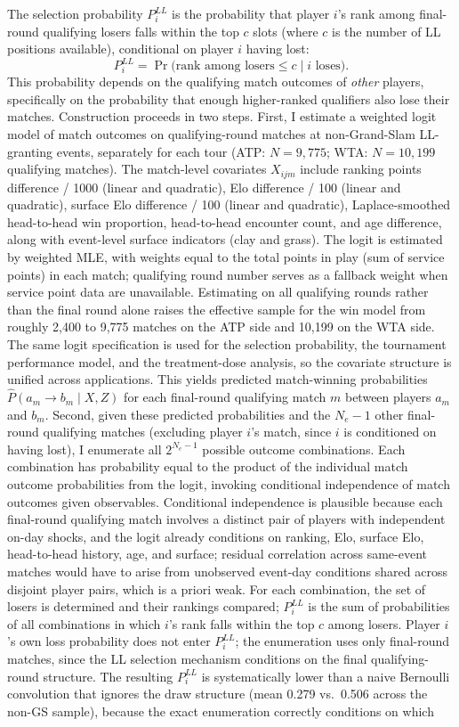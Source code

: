The selection probability $P_i^{LL}$ is the probability that player $i$'s rank among final-round qualifying losers falls within the top $c$ slots (where $c$ is the number of LL positions available), conditional on player $i$ having lost:
\[
P_i^{LL} = \Pr\bigl(\text{rank among losers} \leq c \mid i \text{ loses}\bigr).
\]
This probability depends on the qualifying match outcomes of \textit{other} players, specifically on the probability that enough higher-ranked qualifiers also lose their matches. Construction proceeds in two steps. First, I estimate a weighted logit model of match outcomes on qualifying-round matches at non-Grand-Slam LL-granting events, separately for each tour (ATP: $N = 9{,}775$; WTA: $N = 10{,}199$ qualifying matches). The match-level covariates $X_{ijm}$ include ranking points difference / 1000 (linear and quadratic), Elo difference / 100 (linear and quadratic), surface Elo difference / 100 (linear and quadratic), Laplace-smoothed head-to-head win proportion, head-to-head encounter count, and age difference, along with event-level surface indicators (clay and grass). The logit is estimated by weighted MLE, with weights equal to the total points in play (sum of service points) in each match; qualifying round number serves as a fallback weight when service point data are unavailable. Estimating on all qualifying rounds rather than the final round alone raises the effective sample for the win model from roughly 2,400 to 9,775 matches on the ATP side and 10,199 on the WTA side. The same logit specification is used for the selection probability, the tournament performance model, and the treatment-dose analysis, so the covariate structure is unified across applications. This yields predicted match-winning probabilities $\hat{P}(a_m \to b_m \mid X, Z)$ for each final-round qualifying match $m$ between players $a_m$ and $b_m$. Second, given these predicted probabilities and the $N_e - 1$ other final-round qualifying matches (excluding player $i$'s match, since $i$ is conditioned on having lost), I enumerate all $2^{N_e - 1}$ possible outcome combinations. Each combination has probability equal to the product of the individual match outcome probabilities from the logit, invoking conditional independence of match outcomes given observables. Conditional independence is plausible because each final-round qualifying match involves a distinct pair of players with independent on-day shocks, and the logit already conditions on ranking, Elo, surface Elo, head-to-head history, age, and surface; residual correlation across same-event matches would have to arise from unobserved event-day conditions shared across disjoint player pairs, which is a priori weak. For each combination, the set of losers is determined and their rankings compared; $P_i^{LL}$ is the sum of probabilities of all combinations in which $i$'s rank falls within the top $c$ among losers. Player $i$'s own loss probability does not enter $P_i^{LL}$; the enumeration uses only final-round matches, since the LL selection mechanism conditions on the final qualifying-round structure. The resulting $P_i^{LL}$ is systematically lower than a naive Bernoulli convolution that ignores the draw structure (mean 0.279 vs.\ 0.506 across the non-GS sample), because the exact enumeration correctly conditions on which 